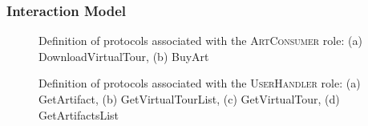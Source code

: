 \documentclass[paper=letter, fontsize=12pt]{article}
\begin{document}
\subsubsection{Interaction Model}

\begin{figure}[H]
  \begin{center}
    \caption{Definition of protocols associated with the \textsc{ArtConsumer} role: (a) \fontfamily{\sfdefault}\selectfont DownloadVirtualTour, (b) BuyArt}
    \label{fig:ac_protocol}
  \end{center}
\end{figure}
\begin{figure}[H]
  \begin{center}
    \caption{Definition of protocols associated with the \textsc{UserHandler} role: (a) \fontfamily{\sfdefault}\selectfont GetArtifact, (b) GetVirtualTourList, (c) GetVirtualTour, (d) GetArtifactsList}
    \label{fig:uh_protocol}
  \end{center}
\end{figure}
\end{document}
